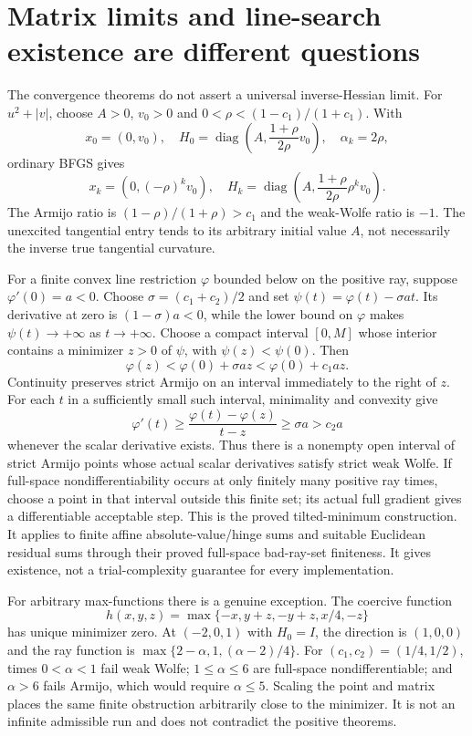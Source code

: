 

\section{Matrix limits and line-search existence are different questions}

The convergence theorems do not assert a universal inverse-Hessian limit. For $u^2+|v|$, choose $A>0$, $v_0>0$ and $0<\rho<(1-c_1)/(1+c_1)$. With
\[
 x_0=(0,v_0),\quad
 H_0=\operatorname{diag}\left(A,\frac{1+\rho}{2\rho}v_0\right),\quad\alpha_k=2\rho,
\]
ordinary BFGS gives
\[
 x_k=(0,(-\rho)^kv_0),\quad
 H_k=\operatorname{diag}\left(A,\frac{1+\rho}{2\rho}\rho^kv_0\right).
\]
The Armijo ratio is $(1-\rho)/(1+\rho)>c_1$ and the weak-Wolfe ratio is $-1$. The unexcited tangential entry tends to its arbitrary initial value $A$, not necessarily the inverse true tangential curvature.

For a finite convex line restriction $\varphi$ bounded below on the positive ray, suppose $\varphi'(0)=a<0$. Choose $\sigma=(c_1+c_2)/2$ and set $\psi(t)=\varphi(t)-\sigma at$. Its derivative at zero is $(1-\sigma)a<0$, while the lower bound on $\varphi$ makes $\psi(t)\to+\infty$ as $t\to+\infty$. Choose a compact interval $[0,M]$ whose interior contains a minimizer $z>0$ of $\psi$, with $\psi(z)<\psi(0)$. Then
\[
 \varphi(z)<\varphi(0)+\sigma az<\varphi(0)+c_1az.
\]
Continuity preserves strict Armijo on an interval immediately to the right of $z$. For each $t$ in a sufficiently small such interval, minimality and convexity give
\[
 \varphi'(t)\ge\frac{\varphi(t)-\varphi(z)}{t-z}\ge\sigma a>c_2a
\]
whenever the scalar derivative exists. Thus there is a nonempty open interval of strict Armijo points whose actual scalar derivatives satisfy strict weak Wolfe. If full-space nondifferentiability occurs at only finitely many positive ray times, choose a point in that interval outside this finite set; its actual full gradient gives a differentiable acceptable step. This is the proved tilted-minimum construction. It applies to finite affine absolute-value/hinge sums and suitable Euclidean residual sums through their proved full-space bad-ray-set finiteness. It gives existence, not a trial-complexity guarantee for every implementation.

For arbitrary max-functions there is a genuine exception. The coercive function
\[
 h(x,y,z)=\max\{-x,y+z,-y+z,x/4,-z\}
\]
has unique minimizer zero. At $(-2,0,1)$ with $H_0=I$, the direction is $(1,0,0)$ and the ray function is $\max\{2-\alpha,1,(\alpha-2)/4\}$. For $(c_1,c_2)=(1/4,1/2)$, times $0<\alpha<1$ fail weak Wolfe; $1\le\alpha\le6$ are full-space nondifferentiable; and $\alpha>6$ fails Armijo, which would require $\alpha\le5$. Scaling the point and matrix places the same finite obstruction arbitrarily close to the minimizer. It is not an infinite admissible run and does not contradict the positive theorems.


